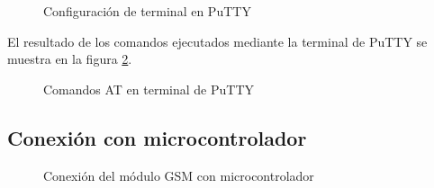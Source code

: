 	\begin{figure}[htbp!]
		\centering
		\caption{Configuración de terminal en PuTTY}
		\label{fig:ConfiguracionPutty}
	\end{figure}
 
El resultado de los comandos ejecutados mediante la terminal de PuTTY se muestra en la figura \ref{fig:TerminalPutty}.

	\begin{figure}[htbp!]
		\centering
		\caption{Comandos AT en terminal de PuTTY}
		\label{fig:TerminalPutty}
	\end{figure}
\pagebreak

\subsection{Conexión con microcontrolador}

	\begin{figure}[htbp!]
		\centering
		\caption{Conexión del módulo GSM con microcontrolador}
		\label{fig:ConexionGSM}
	\end{figure}